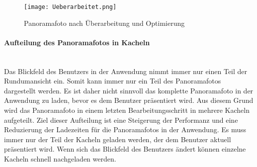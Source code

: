\begin{figure}[htb]
\centering
\texttt{[image: Ueberarbeitet.png]}
\caption[Panoramafoto nach Überarbeitung und Optimierung]{Panoramafoto nach
Überarbeitung und Optimierung\protect\footnotemark}
\label{fig:Ueberarbeitet}
\end{figure}

\paragraph{Aufteilung des Panoramafotos in Kacheln} \hfill \\

Das Blickfeld des Benutzers in der Anwendung nimmt immer nur einen Teil der
Rundumansicht ein. Somit kann immer nur ein Teil des Panoramafotos
dargestellt werden. Es ist daher nicht sinnvoll das komplette Panoramafoto in
der Anwendung zu laden, bevor es dem Benutzer präsentiert wird.
Aus diesem Grund wird das Panoramafoto in einem letzten Bearbeitungsschritt in
mehrere Kacheln aufgeteilt. Ziel dieser Aufteilung ist eine Steigerung der
Performanz und eine Reduzierung der Ladezeiten für die Panoramafotos in der
Anwendung. Es muss immer nur der Teil der Kacheln geladen werden, der dem
Benutzer aktuell präsentiert wird. Wenn sich das Blickfeld des Benutzers ändert
können einzelne Kacheln schnell nachgeladen werden.